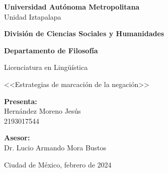 \begin{titlepage}
\begin{center}

{\LARGE \textbf{Universidad Autónoma Metropolitana}} \\
{\Large Unidad Iztapalapa} \vspace{3cm}

{\Large \textbf{División de Ciencias Sociales y Humanidades}} \vspace{2cm}

{\large \textbf{Departamento de Filosofía}}

{\Large Licenciatura en Lingüística} \vspace{2cm}

{\Large <<Estrategias de marcación de la negación>>} \vspace{2cm}


{\Large \textbf{Presenta:}} \\
{\Large Hernández Moreno Jesús \\
2193017544} \vspace{2cm}

{\Large \textbf{Asesor:}} \\
{\Large Dr. Lucio Armando Mora Bustos} \vfill
 
{\Large Ciudad de México, febrero de 2024}
\end{center}   
\end{titlepage}